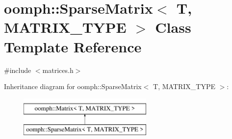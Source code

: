\hypertarget{classoomph_1_1SparseMatrix}{}\section{oomph\+:\+:Sparse\+Matrix$<$ T, M\+A\+T\+R\+I\+X\+\_\+\+T\+Y\+PE $>$ Class Template Reference}
\label{classoomph_1_1SparseMatrix}


{\ttfamily \#include $<$matrices.\+h$>$}

Inheritance diagram for oomph\+:\+:Sparse\+Matrix$<$ T, M\+A\+T\+R\+I\+X\+\_\+\+T\+Y\+PE $>$\+:\begin{figure}[H]
\begin{center}
\leavevmode
\includegraphics[height=2.000000cm]{classoomph_1_1SparseMatrix}
\end{center}
\end{figure}
